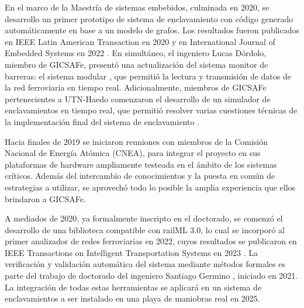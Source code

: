     En el marco de la Maestría de sistemas embebidos, culminada en 2020, se desarrollo un primer prototipo de sistema de enclavamiento con código generado automáticamente en base a un modelo de grafos. Los resultados fueron publicados en IEEE Latin American Transaction en 2020 \cite{Paper_204} y en International Journal of Embedded Systems en 2022 \cite{Paper_206}. En simultáneo, el ingeniero Lucas Dórdolo, miembro de GICSAFe, presentó una actualización del sistema monitor de barreras: el sistema modular \cite{Paper_209}, que permitió la lectura y transmisión de datos de la red ferroviaria en tiempo real. Adicionalmente, miembros de GICSAFe pertenecientes a UTN-Haedo comenzaron el desarrollo de un simulador de enclavamientos en tiempo real, que permitió resolver varias cuestiones técnicas de la implementación final del sistema de enclavamiento \cite{Paper_205}.

    Hacia finales de 2019 se iniciaron reuniones con miembros de la Comisión Nacional de Energía Atómica (CNEA), para integrar el proyecto en sus plataformas de hardware ampliamente testeada en el ámbito de los sistemas críticos. Además del intercambio de conocimientos y la puesta en común de estrategias a utilizar, se aprovechó todo lo posible la amplia experiencia que ellos brindaron a GICSAFe.
    
    A mediados de 2020, ya formalmente inscripto en el doctorado, se comenzó el desarrollo de una biblioteca compatible con railML 3.0, lo cual se incorporó al primer analizador de redes ferroviarias en 2022, cuyos resultados se publicaron en IEEE Transactions on Intelligent Transportation Systems en 2023 \cite{Paper_208}. La verificación y validación automática del sistema mediante métodos formales es parte del trabajo de doctorado del ingeniero Santiago Germino \cite{Paper_207}, iniciado en 2021. La integración de todas estas herramientas se aplicará en un sistema de enclavamientos a ser instalado en una playa de maniobras real en 2025. 